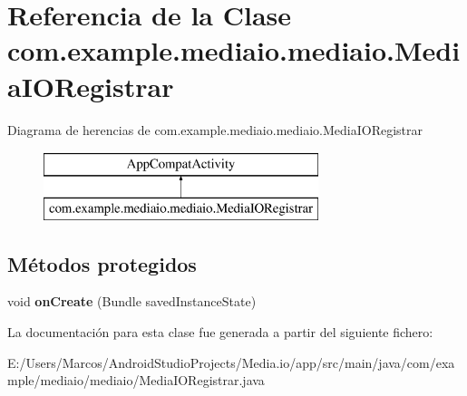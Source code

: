 \hypertarget{classcom_1_1example_1_1mediaio_1_1mediaio_1_1_media_i_o_registrar}{}\section{Referencia de la Clase com.\+example.\+mediaio.\+mediaio.\+Media\+I\+O\+Registrar}
\label{classcom_1_1example_1_1mediaio_1_1mediaio_1_1_media_i_o_registrar}
Diagrama de herencias de com.\+example.\+mediaio.\+mediaio.\+Media\+I\+O\+Registrar\begin{figure}[H]
\begin{center}
\leavevmode
\includegraphics[height=2.000000cm]{classcom_1_1example_1_1mediaio_1_1mediaio_1_1_media_i_o_registrar}
\end{center}
\end{figure}
\subsection*{Métodos protegidos}
\begin{DoxyCompactItemize}
\item 
\mbox{\label{classcom_1_1example_1_1mediaio_1_1mediaio_1_1_media_i_o_registrar_aeb92c6562f9938323bbafe38560fec8f}} 
void {\bfseries on\+Create} (Bundle saved\+Instance\+State)
\end{DoxyCompactItemize}


La documentación para esta clase fue generada a partir del siguiente fichero\+:\begin{DoxyCompactItemize}
\item 
E\+:/\+Users/\+Marcos/\+Android\+Studio\+Projects/\+Media.\+io/app/src/main/java/com/example/mediaio/mediaio/Media\+I\+O\+Registrar.\+java\end{DoxyCompactItemize}
